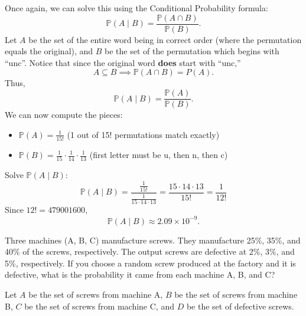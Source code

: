 \documentclass{jhwhw}
\begin{document}
    \solution
        Once again, we can solve this using the Conditional Probability formula:
        \[
            \mathbb{P}(A \mid B) = \frac{\mathbb{P}(A \cap B)}{\mathbb{P}(B)}.
        \]
        Let \(A\) be the set of the entire word being in correct order (where the permutation equals the original),
        and \(B\) be the set of the permutation which begins with “unc”. Notice that since the original word \textbf{does} start with
        “unc,”
        \[
            A \subseteq  B \implies \mathbb{P}(A \cap  B) = P(A).
        \]
        Thus,
        \[
            \mathbb{P}(A \mid B) = \frac{\mathbb{P}(A)}{\mathbb{P}(B)}.
        \]
        We can now compute the pieces:
        \begin{itemize}
            \item \(\mathbb{P}(A) = \frac{1}{15!}\) (1 out of 15! permutations match exactly)
            \item \(\mathbb{P}(B) = \frac{1}{15} \cdot \frac{1}{14} \cdot \frac{1}{13}\) (first letter must be u, then n, then c)  
        \end{itemize}
        Solve \(\mathbb{P}(A \mid B)\):
        \[
            \mathbb{P}(A \mid B) = \frac{\frac{1}{15!}}{\frac{1}{15 \cdot 14 \cdot 13}} = \frac{15 \cdot 14 \cdot 13}{15!} = \frac{1}{12!}
        \]
        Since \(12! = 479001600\),
        \[
            \mathbb{P}(A \mid B) \approx 2.09 \times 10^{-9}.
        \]  

    \problem{}
        Three machines (A, B, C) manufacture screws. They manufacture 25\%, 35\%, and 40\% of the
screws, respectively. The output screws are defective at 2\%, 3\%, and 5\%, respectively. If you
choose a random screw produced at the factory and it is defective, what is the probability it
came from each machine A, B, and C?

    \solution
        Let \(A\) be the set of screws from machine A, \(B\) be the set of screws from machine B, \(C\) be the set of screws from machine C,
        and \(D\) be the set of defective screws.
\end{document}
